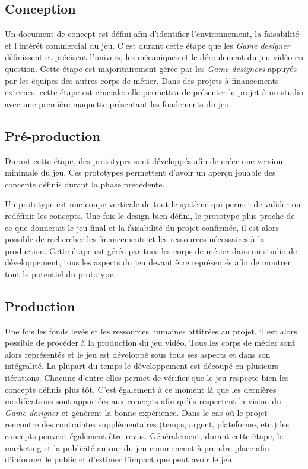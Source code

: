 \subsection{Conception}


Un document de concept est d\'efini afin d'identifier l'environnement, la faisabilité et l'intérêt commercial du jeu. C'est durant cette étape que les \emph{Game designer} définissent et précisent l'univers, les mécaniques et le déroulement du jeu vidéo en question. Cette étape est majoritairement gérée par les \emph{Game designers} appuyés par les équipes des autres corps de métier. Dans des projets à financements externes, cette étape est cruciale: elle permettra de présenter le projet à un studio avec une première maquette présentant les fondements du jeu.

\subsection{Pr\'e-production}
Durant cette étape, des prototypes sont développés afin de créer une version minimale du jeu. Ces prototypes permettent d'avoir un aperçu jouable des concepts définis durant la phase précédente. 

Un prototype est une coupe verticale de tout le système qui permet de valider ou redéfinir les concepts. Une fois le design bien défini, le prototype plus proche de ce que donnerait le jeu final et la faisabilité du projet confirmée, il est alors possible de rechercher les financements et les ressources nécessaires à la production. Cette étape est gérée par tous les corps de métier dans un studio de développement, tous les aspects du jeu devant être représentés afin de montrer tout le potentiel du prototype.

\subsection{Production}
Une fois les fonds levés et les ressources humaines attitrées au projet, il est alors possible de procéder à la production du jeu vidéo. Tous les corps de métier sont alors représentés et le jeu est développé sous tous ses aspects et dans son intégralité. La plupart du temps le développement est découpé en plusieurs itérations. Chacune d'entre elles permet de vérifier que le jeu respecte bien les concepts définis plus tôt. C'est également à ce moment là que les dernières modifications sont apportées aux concepts afin qu'ils respectent la vision du \emph{Game designer} et génèrent la bonne expérience. Dans le cas o\`u le projet rencontre des contraintes supplémentaires (temps, argent, plateforme, etc.) les concepts peuvent également être revus. Généralement, durant cette étape, le marketing et la publicité autour du jeu commencent à prendre place afin d'informer le public et d'estimer l'impact que peut avoir le jeu.


